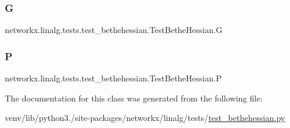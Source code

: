 \subsubsection{\texorpdfstring{G}{G}}
{\footnotesize\ttfamily networkx.\+linalg.\+tests.\+test\+\_\+bethehessian.\+Test\+Bethe\+Hessian.\+G}

\mbox{\label{classnetworkx_1_1linalg_1_1tests_1_1test__bethehessian_1_1TestBetheHessian_ac877d5637427f8f21bd0a82024181204}} 
\subsubsection{\texorpdfstring{P}{P}}
{\footnotesize\ttfamily networkx.\+linalg.\+tests.\+test\+\_\+bethehessian.\+Test\+Bethe\+Hessian.\+P}



The documentation for this class was generated from the following file\+:\begin{DoxyCompactItemize}
\item 
venv/lib/python3./site-\/packages/networkx/linalg/tests/\hyperlink{test__bethehessian_8py}{test\+\_\+bethehessian.\+py}\end{DoxyCompactItemize}
